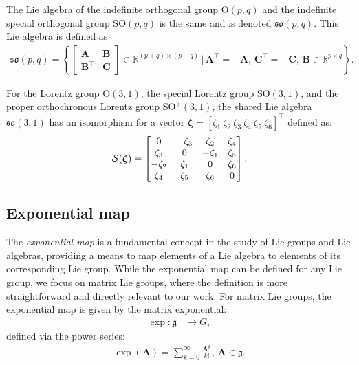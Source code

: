 \begin{example}\label{ex:lorentz-group-lie-algebra}
    The Lie algebra of the indefinite orthogonal group $\text{O}(p, q)$ and the indefinite special orthogonal group $\text{SO}(p, q)$ is the same and is denoted $\mathfrak{so}(p, q)$. This Lie algebra is defined as
    \begin{align*}
        \mathfrak{so}(p, q) = \left\{
            \begin{bmatrix}
                \mathbf{A} & \mathbf{B}\\
                \mathbf{B}^\top & \mathbf{C}
            \end{bmatrix} \in \mathbb{R}^{(p+q)\times(p+q)} \,\biggl|\,  \mathbf{A}^\top = -\mathbf{A},\, \mathbf{C}^\top = -\mathbf{C},\, \mathbf{B} \in \mathbb{R}^{p\times q}
        \right\}.
    \end{align*}

    For the Lorentz group $\text{O}(3, 1)$, the special Lorentz group $\text{SO}(3, 1)$, and the proper orthochronous Lorentz group $\text{SO}^+(3, 1)$, the shared Lie algebra $\mathfrak{so}(3, 1)$ has an isomorphism for a vector $\boldsymbol{\zeta} = [\zeta_1\ \zeta_2\ \zeta_3\ \zeta_4\ \zeta_5\ \zeta_6]^\top$ defined as:
    \begin{align*}
        \SL[\boldsymbol{\zeta}] = \begin{bmatrix}
            0 & -\zeta_3 & \zeta_2 & \zeta_4 \\
            \zeta_3 & 0 & -\zeta_1 & \zeta_5 \\
            -\zeta_2 & \zeta_1 & 0 & \zeta_6 \\
            \zeta_4 & \zeta_5 & \zeta_6 & 0
        \end{bmatrix}.
    \end{align*}
\end{example}
\subsection{Exponential map}\label{sec:background-exponential-map}
The \emph{exponential map} is a fundamental concept in the study of Lie groups and Lie algebras, providing a means to map elements of a Lie algebra to elements of its corresponding Lie group. While the exponential map can be defined for any Lie group, we focus on matrix Lie groups, where the definition is more straightforward and directly relevant to our work. For matrix Lie groups, the exponential map is given by the matrix exponential:
\begin{align}
    \exp : \mathfrak{g} &\to G,
\end{align}
defined via the power series:
\begin{align}
    \exp(\mathbf{A}) = \sum_{k=0}^\infty \frac{\mathbf{A}^k}{k!},\,\mathbf{A}\in \mathfrak{g}.
\end{align}

